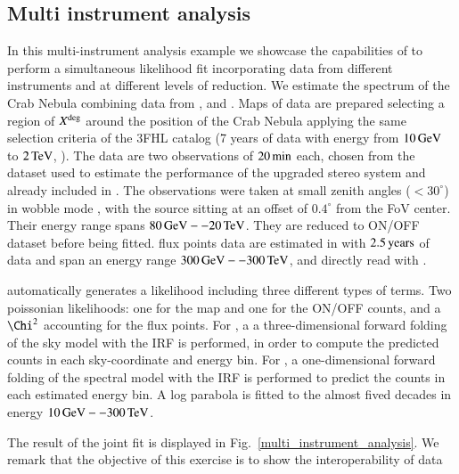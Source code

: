 \subsection{Multi instrument analysis}
\label{ssec:multi-instrument-analysis}

\begin{figure*}[t]
	\sidecaption
	\texttt{[image: figures/multi\_instrument\_analysis.pdf]}
	\caption{A multi-instrument analysis of the Crab Nebula}
	multi_instrument_analysismulti_instrument_analysis}
\end{figure*}


In this multi-instrument analysis example we showcase the capabilities of \gammapy
to perform a simultaneous likelihood fit incorporating data from different instruments
and at different levels of reduction.
We estimate the spectrum of the Crab Nebula combining data from \fermi, \magic and \hawc.
Maps of \fermi data are prepared selecting a region of $X^{\rm deg}$ around the
position of the Crab Nebula applying the same selection criteria of the 3FHL
catalog (7 years of data with energy from $10\,{\rm GeV}$ to $2\,{\rm TeV}$, ).
The \MAGIC data are two observations of $20\,{\rm min}$ each, chosen from the
dataset used to estimate the performance of the upgraded stereo system \citep{magic_performance}
and already included in \cite{joint_crab}. The observations were taken at small
zenith angles ($<30^{\circ}$) in wobble mode \citep{fomin_1994}, with the source
sitting at an offset of $0.4^{\circ}$ from the FoV center. Their energy range spans
$80\,{\rm GeV} -- 20\,{\rm TeV}$. They are reduced to ON/OFF dataset before being fitted.
\hawc flux points data are estimated in \cite{hawc_crab_2019} with $2.5\,{\rm years}$
of data and span an energy range $300\,{\rm GeV} -- 300\,{\rm TeV}$, and directly read with \gammapy.

\gammapy automatically generates a likelihood including three different types of
terms. Two poissonian likelihoods: one for the \fermi map and one for the ON/OFF
counts, and a $\Chi^2$ accounting for the flux points. For \fermi, a
a three-dimensional forward folding of the sky model with the IRF is performed,
in order to compute the predicted counts in each sky-coordinate and energy bin.
For \magic, a one-dimensional forward folding of the spectral model with the IRF
is performed to predict the counts in each estimated energy bin.
A log parabola is fitted to the almost fived decades in energy $10\,{\rm GeV} -- 300\,{\rm TeV}$.

The result of the joint fit is displayed in Fig.~\ref{multi_instrument_analysis}.
We remark that the objective of this exercise is to show the interoperability of data

